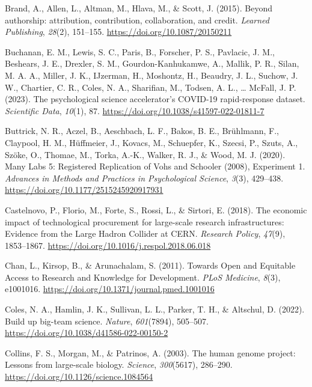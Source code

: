 \documentclass[
  man,floatsintext]{apa7}
\newlength{\cslhangindent}
\newenvironment{CSLReferences}[2] %
 {\begin{list}{}{%
  \setlength{\itemindent}{0pt}
  \setlength{\leftmargin}{0pt}
  \setlength{\parsep}{0pt}
  \ifodd #1
   \setlength{\leftmargin}{\cslhangindent}
   \setlength{\itemindent}{-1\cslhangindent}
  \fi
  \setlength{\itemsep}{#2\baselineskip}}}
 {\end{list}}
\begin{document}
\begin{CSLReferences}{1}{0}
Brand, A., Allen, L., Altman, M., Hlava, M., \& Scott, J. (2015). Beyond authorship: attribution, contribution, collaboration, and credit. \emph{Learned Publishing}, \emph{28}(2), 151--155. \url{https://doi.org/10.1087/20150211}

Buchanan, E. M., Lewis, S. C., Paris, B., Forscher, P. S., Pavlacic, J. M., Beshears, J. E., Drexler, S. M., Gourdon-Kanhukamwe, A., Mallik, P. R., Silan, M. A. A., Miller, J. K., IJzerman, H., Moshontz, H., Beaudry, J. L., Suchow, J. W., Chartier, C. R., Coles, N. A., Sharifian, M., Todsen, A. L., \ldots{} McFall, J. P. (2023). The psychological science accelerator{'}s COVID-19 rapid-response dataset. \emph{Scientific Data}, \emph{10}(1), 87. \url{https://doi.org/10.1038/s41597-022-01811-7}

Buttrick, N. R., Aczel, B., Aeschbach, L. F., Bakos, B. E., Brühlmann, F., Claypool, H. M., Hüffmeier, J., Kovacs, M., Schuepfer, K., Szecsi, P., Szuts, A., Szöke, O., Thomae, M., Torka, A.-K., Walker, R. J., \& Wood, M. J. (2020). Many Labs 5: Registered Replication of Vohs and Schooler (2008), Experiment 1. \emph{Advances in Methods and Practices in Psychological Science}, \emph{3}(3), 429--438. \url{https://doi.org/10.1177/2515245920917931}

Castelnovo, P., Florio, M., Forte, S., Rossi, L., \& Sirtori, E. (2018). The economic impact of technological procurement for large-scale research infrastructures: Evidence from the Large Hadron Collider at CERN. \emph{Research Policy}, \emph{47}(9), 1853--1867. \url{https://doi.org/10.1016/j.respol.2018.06.018}

Chan, L., Kirsop, B., \& Arunachalam, S. (2011). Towards Open and Equitable Access to Research and Knowledge for Development. \emph{PLoS Medicine}, \emph{8}(3), e1001016. \url{https://doi.org/10.1371/journal.pmed.1001016}

Coles, N. A., Hamlin, J. K., Sullivan, L. L., Parker, T. H., \& Altschul, D. (2022). Build up big-team science. \emph{Nature}, \emph{601}(7894), 505--507. \url{https://doi.org/10.1038/d41586-022-00150-2}

Collins, F. S., Morgan, M., \& Patrinos, A. (2003). The human genome project: Lessons from large-scale biology. \emph{Science}, \emph{300}(5617), 286--290. \url{https://doi.org/10.1126/science.1084564}


\end{CSLReferences}
\end{document}
